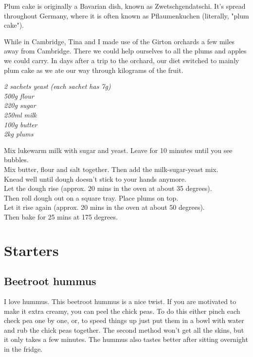 \documentclass{tufte-book}
\begin{document}
Plum cake is originally a Bavarian dish, known as Zwetschgendatschi. It's spread throughout Germany, where it is often known as Pflaumenkuchen (literally, "plum cake"). 

While in Cambridge, Tina and I made use of the Girton orchards a few miles away from Cambridge. There we could help ourselves to all the plums and apples we could carry. In days after a trip to the orchard, our diet switched to mainly plum cake as we ate our way through kilograms of the fruit.

\smallskip
\emph{2 sachets yeast (each sachet has 7g)
\\500g flour
\\220g sugar
\\250ml milk
\\100g butter
\\2kg plums
}

\smallskip
Mix lukewarm milk with sugar and yeast. Leave for 10 minutes until you see bubbles. 
\\Mix butter, flour and salt together. Then add the milk-sugar-yeast mix.
\\Knead well until dough doesn't stick to your hands anymore.
\\Let the dough rise (approx. 20 mins in the oven at about 35 degrees).
\\Then roll dough out on a square tray. Place plums on top. 
\\Let it rise again (approx. 20 mins in the oven at about 50 degrees).
\\Then bake for 25 mins at 175 degrees.

\chapter{Starters}
\section{Beetroot hummus}

I love hummus. This beetroot hummus is a nice twist. If you are motivated to make it extra creamy, you can peel the chick peas. To do this either pinch each check pea one by one, or, to speed things up just put them in a bowl with water and rub the chick peas together. The second method won't get all the skins, but it only takes a few minutes. The hummus also tastes better after sitting overnight in the fridge.
\end{document}

